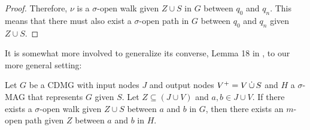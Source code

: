 \begin{proof}
  Therefore, $\nu$ is a $\sigma$-open walk given $Z \cup S$ in $G$ between $q_0$ and $q_n$.
  This means that there must also exist a $\sigma$-open path in $G$ between $q_0$ and $q_n$ given $Z \cup S$.
\end{proof}

It is somewhat more involved to generalize its converse, Lemma 18 in \cite{SpirtesRichardson97}, to our more general setting:
\begin{Lem}\label{lem:cdmg_sigma-open_path_implies_sigmamag_open_path}
  Let $G$ be a CDMG with input nodes $J$ and output nodes $V^+ = V \,\dot{\cup}\, S$ and $H$ a $\sigma$-MAG that represents $G$ given $S$.
  Let $Z \subseteq (J \cup V)$ and $a,b \in J \cup V$.
  If there exists a $\sigma$-open walk given $Z \cup S$ between $a$ and $b$ in $G$, then there exists an $m$-open path given $Z$ between $a$ and $b$ in $H$.
\end{Lem}
